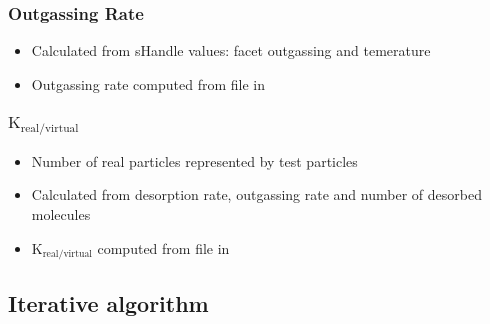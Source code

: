 \subsubsection{Outgassing Rate}
\begin{itemize}[noitemsep,topsep=0pt]
\item Calculated from sHandle values: facet outgassing and temerature
\item Outgassing rate computed from  file in 
\end{itemize}

\subsubsection{$\text{K}_{\text{real}/\text{virtual}}$}
\begin{itemize}[noitemsep,topsep=0pt]
\item Number of real particles represented by test particles
\item Calculated from desorption rate, outgassing rate and number of desorbed molecules
\item $\text{K}_{\text{real}/\text{virtual}}$ computed from  file in 
\end{itemize}


\subsection{Iterative algorithm}

